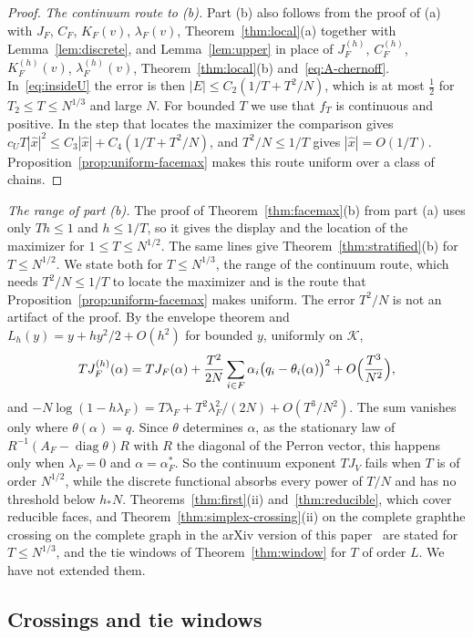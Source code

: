 \begin{proof}
\emph{The continuum route to (b).} Part (b) also follows from the proof of (a)
with $J_F$, $C_F$, $K_F(v)$, $\lambda_F(v)$, Theorem~\ref{thm:local}(a) together
with Lemma~\ref{lem:discrete}, and Lemma~\ref{lem:upper} in place of $J^{(h)}_F$,
$C^{(h)}_F$, $K^{(h)}_F(v)$, $\lambda^{(h)}_F(v)$, Theorem~\ref{thm:local}(b)
and~\eqref{eq:A-chernoff}. In~\eqref{eq:insideU} the error is then
$|E|\le C_2(1/T+T^2/N)$, which is at most $\frac12$ for $T_2\le T\le N^{1/3}$ and large $N$.
For bounded $T$ we use that $f_T$ is continuous and positive. In the step that locates the
maximizer the comparison gives $c_UT|\hat x|^2\le C_3|\hat x|+C_4(1/T+T^2/N)$, and
$T^2/N\le1/T$ gives $|\hat x|=O(1/T)$. Proposition~\ref{prop:uniform-facemax} makes this
route uniform over a class of chains.
\end{proof}

\emph{The range of part (b).} The proof of Theorem~\ref{thm:facemax}(b) from part (a)
uses only $Th\le1$ and $h\le1/T$, so it gives the display and the location of the
maximizer for $1\le T\le N^{1/2}$. The same lines give Theorem~\ref{thm:stratified}(b)
for $T\le N^{1/2}$. We state both for $T\le N^{1/3}$, the range of the continuum route,
which needs $T^2/N\le1/T$ to locate the maximizer and is the route that
Proposition~\ref{prop:uniform-facemax} makes uniform. The error $T^2/N$ is not an
artifact of the proof. By the envelope theorem and $L_h(y)=y+hy^2/2+O(h^2)$ for bounded $y$,
uniformly on $\mathcal K$,
\[
 TJ^{(h)}_F(\alpha)=TJ_F(\alpha)+\frac{T^2}{2N}\sum_{i\in F}\alpha_i\bigl(q_i-\theta_i(\alpha)\bigr)^2
 +O\Bigl(\frac{T^3}{N^2}\Bigr),
\]
and $-N\log(1-h\lambda_F)=T\lambda_F+T^2\lambda_F^2/(2N)+O(T^3/N^2)$. The sum
vanishes only where $\theta(\alpha)=q$. Since $\theta$ determines $\alpha$, as the
stationary law of $R^{-1}(A_F-\operatorname{diag}\theta)R$ with $R$ the diagonal of
the Perron vector, this happens only when $\lambda_F=0$ and $\alpha=\alpha^*_F$. So
the continuum exponent $TJ_V$ fails when $T$ is of order $N^{1/2}$, while the
discrete functional absorbs every power of $T/N$ and has no threshold below $h_*N$.
Theorems~\ref{thm:first}(ii) and~\ref{thm:reducible}, which cover reducible faces, and
\ifarxivbuild Theorem~\ref{thm:simplex-crossing}(ii) on the complete graph\else the crossing on the
complete graph in the arXiv version of this paper~\cite{arxivC1}\fi{} are stated for
$T\le N^{1/3}$, and the tie windows of Theorem~\ref{thm:window} for $T$ of order
$L$. We have not extended them.

\subsection{Crossings and tie windows}\label{sec:crossings}

